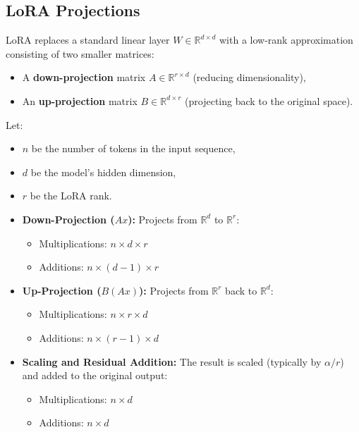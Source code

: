 \documentclass[a4paper,12pt]{article}
\begin{document}
\subsection*{LoRA Projections}

LoRA replaces a standard linear layer $W \in \mathbb{R}^{d \times d}$ with a low-rank approximation consisting of two smaller matrices:
\begin{itemize}
  \item A \textbf{down-projection} matrix $A \in \mathbb{R}^{r \times d}$ (reducing dimensionality),
  \item An \textbf{up-projection} matrix $B \in \mathbb{R}^{d \times r}$ (projecting back to the original space).
\end{itemize}

Let:
\begin{itemize}
  \item $n$ be the number of tokens in the input sequence,
  \item $d$ be the model's hidden dimension,
  \item $r$ be the LoRA rank.
\end{itemize}

\begin{itemize}
  \item \textbf{Down-Projection ($A x$):} Projects from $\mathbb{R}^{d}$ to $\mathbb{R}^{r}$:
  \begin{itemize}
    \item Multiplications: $n \times d \times r$
    \item Additions: $n \times (d - 1) \times r$
  \end{itemize}

  \item \textbf{Up-Projection ($B (A x)$):} Projects from $\mathbb{R}^{r}$ back to $\mathbb{R}^{d}$:
  \begin{itemize}
    \item Multiplications: $n \times r \times d$
    \item Additions: $n \times (r - 1) \times d$
  \end{itemize}

  \item \textbf{Scaling and Residual Addition:} The result is scaled (typically by $\alpha / r$) and added to the original output:
  \begin{itemize}
    \item Multiplications: $n \times d$
    \item Additions: $n \times d$
  \end{itemize}
\end{itemize}
\end{document}
